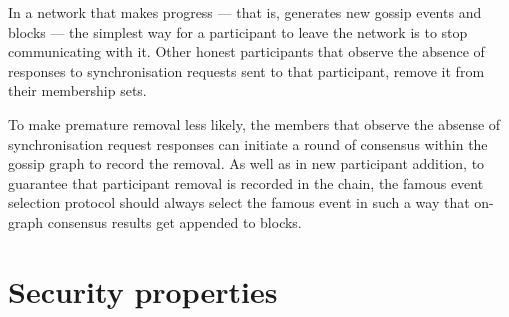 \documentclass[a4paper,11pt]{article}
\begin{document}
In a network that makes progress --- that is, generates new gossip events and blocks --- the
simplest way for a participant to leave the network is to stop communicating with it. Other honest
participants that observe the absence of responses to synchronisation requests sent to that
participant, remove it from their membership sets.

To make premature removal less likely, the members that observe the absense of synchronisation
request responses can initiate a round of consensus within the gossip graph to record the
removal. As well as in new participant addition, to guarantee that participant removal is recorded
in the chain, the famous event selection protocol should always select the famous event in such a
way that on-graph consensus results get appended to blocks.


\section{Security properties}\label{sec:security}
\end{document}
